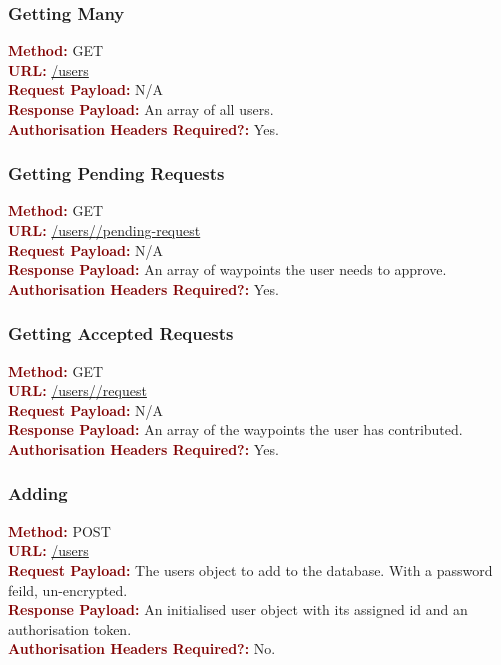 \documentclass[11pt,a4paper]{report}
\begin{document}
\subsubsection{Getting Many}
\textbf{\textcolor{Maroon}{Method:}} GET\\
\textbf{\textcolor{Maroon}{URL:}} \url{/users}\\
\textbf{\textcolor{Maroon}{Request Payload:}} N/A\\
\textbf{\textcolor{Maroon}{Response Payload:}} An array of all users.\\
\textbf{\textcolor{Maroon}{Authorisation Headers Required?:}} Yes.

\subsubsection{Getting Pending Requests}
\textbf{\textcolor{Maroon}{Method:}} GET\\
\textbf{\textcolor{Maroon}{URL:}} \url{/users/}\url{/pending-request}\\
\textbf{\textcolor{Maroon}{Request Payload:}} N/A\\
\textbf{\textcolor{Maroon}{Response Payload:}} An array of waypoints the user needs to approve.\\
\textbf{\textcolor{Maroon}{Authorisation Headers Required?:}} Yes.

\subsubsection{Getting Accepted Requests}
\textbf{\textcolor{Maroon}{Method:}} GET\\
\textbf{\textcolor{Maroon}{URL:}} \url{/users/}\url{/request}\\
\textbf{\textcolor{Maroon}{Request Payload:}} N/A\\
\textbf{\textcolor{Maroon}{Response Payload:}} An array of the waypoints the user has contributed.\\
\textbf{\textcolor{Maroon}{Authorisation Headers Required?:}} Yes.

\subsubsection{Adding}
\textbf{\textcolor{Maroon}{Method:}} POST\\
\textbf{\textcolor{Maroon}{URL:}} \url{/users}\\
\textbf{\textcolor{Maroon}{Request Payload:}} The users object to add to the database. With a password feild, un-encrypted.\\
\textbf{\textcolor{Maroon}{Response Payload:}} An initialised user object with its assigned id and an authorisation token.\\
\textbf{\textcolor{Maroon}{Authorisation Headers Required?:}} No.
\end{document}
